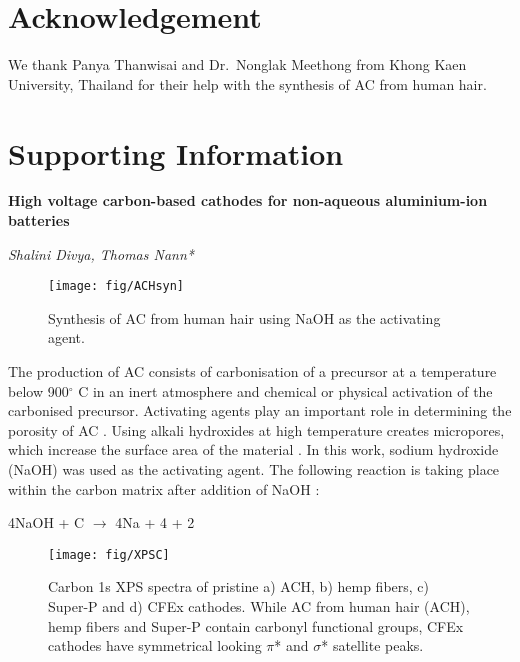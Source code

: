 \documentclass{article}
\begin{document}
\section{Acknowledgement}
We thank Panya Thanwisai and Dr.\ Nonglak Meethong from Khong Kaen University, Thailand for their help with the synthesis of AC from human hair. 

 
\clearpage
\newpage


\section*{Supporting Information}

\begin{center}
  \textbf{\Huge High voltage carbon-based cathodes for non-aqueous aluminium-ion batteries}\vspace{0.5cm}
  
  \textit{Shalini Divya, Thomas Nann*}
\end{center}


\begin{figure}[ht!]
\centering
\texttt{[image: fig/ACHsyn]}
\caption{Synthesis of AC from human hair using NaOH as the activating agent.}
\label{fig:ACHsyn}
\end{figure}

The production of AC consists of carbonisation of a precursor at a temperature below 900$^{\circ}$ C in an inert atmosphere and chemical or physical activation of the carbonised precursor. Activating agents play an important role in determining the porosity of AC \cite{arenas_effect_2004}. Using alkali hydroxides at high temperature creates micropores, which increase the surface area of the material \cite{dong_commercial_2019, liu_hair-based_2017}. In this work, sodium hydroxide (NaOH) was used as the activating agent. The following reaction is taking place within the carbon matrix after addition of NaOH \cite{satish_macroporous_2015}:
\begin{center}
    4NaOH + C $\longrightarrow$ 4Na + 4 + 2
\end{center}

\begin{figure}[h!]
  \centering
  \texttt{[image: fig/XPSC]}
    \caption{Carbon 1s XPS spectra of pristine a) ACH, b) hemp fibers, c) Super-P and d) CFEx cathodes. While AC from human hair (ACH), hemp fibers and Super-P contain carbonyl functional groups, CFEx cathodes have symmetrical looking $\pi$* and $\sigma$* satellite peaks.}
  \label{fig:XPSC}
\end{figure}
\end{document}
